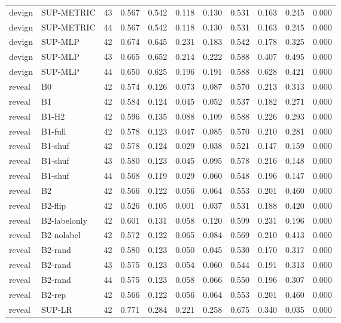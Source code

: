 \begin{tabular}{lllllllllll}
devign & SUP-METRIC & 43 & 0.567 & 0.542 & 0.118 & 0.130 & 0.531 & 0.163 & 0.245 & 0.000 \\
devign & SUP-METRIC & 44 & 0.567 & 0.542 & 0.118 & 0.130 & 0.531 & 0.163 & 0.245 & 0.000 \\
devign & SUP-MLP & 42 & 0.674 & 0.645 & 0.231 & 0.183 & 0.542 & 0.178 & 0.325 & 0.000 \\
devign & SUP-MLP & 43 & 0.665 & 0.652 & 0.214 & 0.222 & 0.588 & 0.407 & 0.495 & 0.000 \\
devign & SUP-MLP & 44 & 0.650 & 0.625 & 0.196 & 0.191 & 0.588 & 0.628 & 0.421 & 0.000 \\
reveal & B0 & 42 & 0.574 & 0.126 & 0.073 & 0.087 & 0.570 & 0.213 & 0.313 & 0.000 \\
reveal & B1 & 42 & 0.584 & 0.124 & 0.045 & 0.052 & 0.537 & 0.182 & 0.271 & 0.000 \\
reveal & B1-H2 & 42 & 0.596 & 0.135 & 0.088 & 0.109 & 0.588 & 0.226 & 0.293 & 0.000 \\
reveal & B1-full & 42 & 0.578 & 0.123 & 0.047 & 0.085 & 0.570 & 0.210 & 0.281 & 0.000 \\
reveal & B1-shuf & 42 & 0.578 & 0.124 & 0.029 & 0.038 & 0.521 & 0.147 & 0.159 & 0.000 \\
reveal & B1-shuf & 43 & 0.580 & 0.123 & 0.045 & 0.095 & 0.578 & 0.216 & 0.148 & 0.000 \\
reveal & B1-shuf & 44 & 0.568 & 0.119 & 0.029 & 0.060 & 0.548 & 0.196 & 0.147 & 0.000 \\
reveal & B2 & 42 & 0.566 & 0.122 & 0.056 & 0.064 & 0.553 & 0.201 & 0.460 & 0.000 \\
reveal & B2-flip & 42 & 0.526 & 0.105 & 0.001 & 0.037 & 0.531 & 0.188 & 0.420 & 0.000 \\
reveal & B2-labelonly & 42 & 0.601 & 0.131 & 0.058 & 0.120 & 0.599 & 0.231 & 0.196 & 0.000 \\
reveal & B2-nolabel & 42 & 0.572 & 0.122 & 0.065 & 0.084 & 0.569 & 0.210 & 0.413 & 0.000 \\
reveal & B2-rand & 42 & 0.580 & 0.123 & 0.050 & 0.045 & 0.530 & 0.170 & 0.317 & 0.000 \\
reveal & B2-rand & 43 & 0.575 & 0.123 & 0.054 & 0.060 & 0.544 & 0.191 & 0.313 & 0.000 \\
reveal & B2-rand & 44 & 0.575 & 0.123 & 0.058 & 0.066 & 0.550 & 0.196 & 0.307 & 0.000 \\
reveal & B2-rep & 42 & 0.566 & 0.122 & 0.056 & 0.064 & 0.553 & 0.201 & 0.460 & 0.000 \\
reveal & SUP-LR & 42 & 0.771 & 0.284 & 0.221 & 0.258 & 0.675 & 0.340 & 0.035 & 0.000 \\

\end{tabular}
